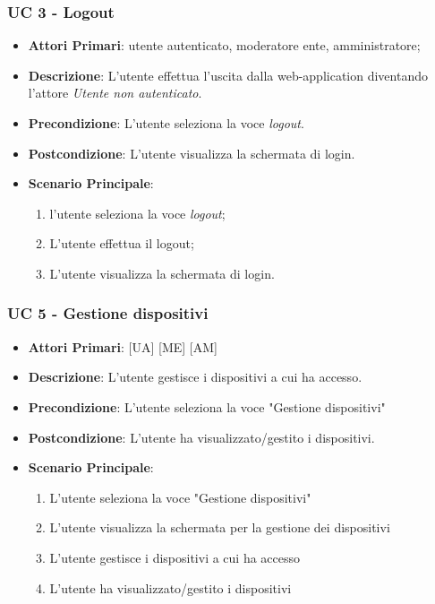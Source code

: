 		\subsubsection{UC 3 - Logout}
		\begin{itemize}
			\item \textbf{Attori Primari}: utente autenticato, moderatore ente, amministratore;
			\item \textbf{Descrizione}: L'utente effettua l'uscita dalla web-application diventando l'attore \textit{Utente non autenticato}.
			\item \textbf{Precondizione}: L'utente seleziona la voce \textit{logout}.
			\item \textbf{Postcondizione}: L'utente visualizza la schermata di login.
			\item \textbf{Scenario Principale}:
			\begin{enumerate}
				\item l'utente seleziona la voce \textit{logout};
				\item L'utente effettua il logout;
				\item L'utente visualizza la schermata di login.
			\end{enumerate}	
		\end{itemize}


		


		\subsubsection{UC 5 - Gestione dispositivi}
		
		
		\begin{itemize}
			\item \textbf{Attori Primari}: [UA] [ME] [AM]
			\item \textbf{Descrizione}: L'utente gestisce i dispositivi a cui ha accesso.
			\item \textbf{Precondizione}: L'utente seleziona la voce "Gestione dispositivi"
			\item \textbf{Postcondizione}: L'utente ha visualizzato/gestito i dispositivi.
			\item \textbf{Scenario Principale}:
			\begin{enumerate}
				\item{L'utente seleziona la voce "Gestione dispositivi"}
				\item{L'utente visualizza la schermata per la gestione dei dispositivi}
				\item{L'utente gestisce i dispositivi a cui ha accesso}
				\item{L'utente ha visualizzato/gestito i dispositivi}
			\end{enumerate}
		\end{itemize}
			
